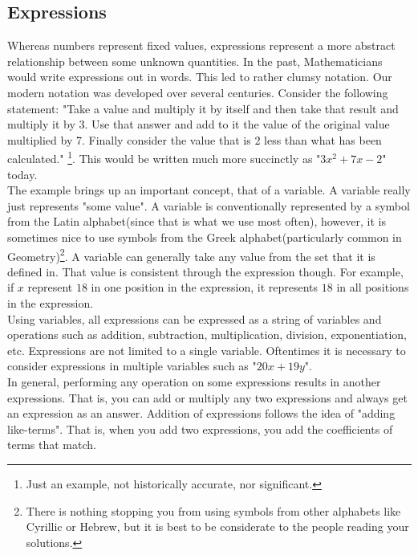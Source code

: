 \documentclass[a4paper,12pt]{article}
\begin{document}
\subsection{Expressions}
Whereas numbers represent fixed values, expressions represent a more abstract relationship between some unknown quantities. In the past, Mathematicians would write expressions out in words. This led to rather clumsy notation. Our modern notation was developed over several centuries. Consider the following statement: "Take a value and multiply it by itself and then take that result and multiply it by 3. Use that answer and add to it the value of the original value multiplied by 7. Finally consider the value that is 2 less than what has been calculated." \footnote{Just an example, not historically accurate, nor significant.}. This would be written much more succinctly as "$3x^{2} + 7x - 2$" today. \\

The example brings up an important concept, that of a variable. A variable really just represents "some value". A variable is conventionally represented by a symbol from the Latin alphabet(since that is what we use most often), however, it is sometimes nice to use symbols from the Greek alphabet(particularly common in Geometry)\footnote{There is nothing stopping you from using symbols from other alphabets like Cyrillic or Hebrew, but it is best to be considerate to the people reading your solutions.}. A variable can generally take any value from the set that it is defined in. That value is consistent through the expression though. For example, if $x$ represent $18$ in one position in the expression, it represents $18$ in all positions in the expression. \\

Using variables, all expressions can be expressed as a string of variables and operations such as addition, subtraction, multiplication, division, exponentiation, etc. Expressions are not limited to a single variable. Oftentimes it is necessary to consider expressions in multiple variables such as "$20x + 19y$". \\

In general, performing any operation on some expressions results in another expressions. That is, you can add or multiply any two expressions and always get an expression as an answer. Addition of expressions follows the idea of "adding like-terms". That is, when you add two expressions, you add the coefficients of terms that match. \\
\end{document}
